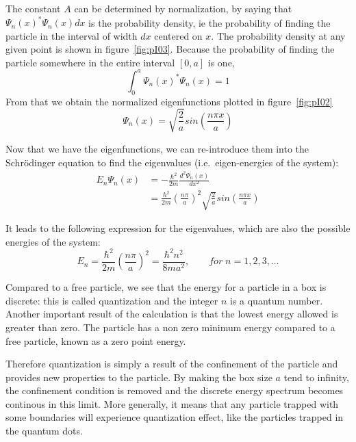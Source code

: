 The constant $A$ can be determined by normalization, by saying that $\Psi_n(x)^* \Psi_n(x) dx$ is the probability density, ie the probability of finding the particle in the interval of width $dx$ centered on $x$. The probability density at any given point is shown in figure~\ref{fig:pI03}. Because the probability of finding the particle somewhere in the entire interval $[0,a]$ is one,
\begin{equation}
\int_0^a \Psi_n(x)^* \Psi_n(x) = 1 \nonumber
\end{equation}
From that we obtain the normalized eigenfunctions plotted in figure~\ref{fig:pI02}
\begin{equation}
\Psi_n(x) = \sqrt{\frac{2}{a}} sin \left( \frac{n \pi x}{a} \right)
\end{equation}

Now that we have the eigenfunctions, we can re-introduce them into the Schr\"odinger equation to find the eigenvalues (i.e.\ eigen-energies of the system):
\begin{align}
E_n \Psi_n(x) &= - \frac{\hbar^2}{2m}\frac{d^2 \Psi_n(x)}{dx^2} \\
&=\frac{\hbar^2}{2m} \left( \frac{n \pi}{a} \right)^2 \sqrt{\frac{2}{a}} sin \left( \frac{n \pi x}{a} \right)
\end{align}

It leads to the following expression for the eigenvalues, which are also the possible energies of the system:
\begin{equation}
E_n= \frac{\hbar^2}{2m} \left( \frac{n \pi}{a} \right)^2 = \frac{\hbar^2 n^2}{8 m a^2}, \qquad for \; n=1,2,3, \dots
\end{equation}

Compared to a free particle, we see that the energy for a particle in a box is discrete: this is called quantization and the integer $n$ is a quantum number. Another important result of the calculation is that the lowest energy allowed is greater than zero. The particle has a non zero minimum energy compared to a free particle, known as a zero point energy.


Therefore quantization is simply a result of the confinement of the particle and provides new properties to the particle. By making the box size $a$ tend to infinity, the confinement condition is removed and the discrete energy spectrum becomes continous in this limit. More generally, it means that any particle trapped with some boundaries will experience quantization effect, like the particles trapped in the quantum dots.

